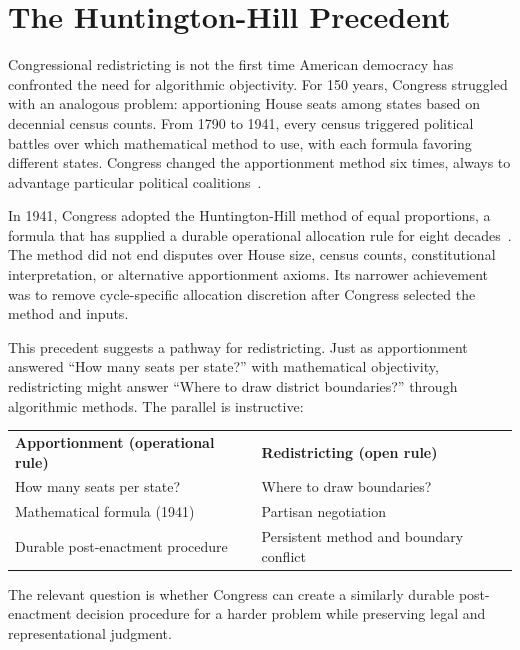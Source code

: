 \section{The Huntington-Hill Precedent}

Congressional redistricting is not the first time American democracy has confronted the need for algorithmic objectivity. For 150 years, Congress struggled with an analogous problem: apportioning House seats among states based on decennial census counts. From 1790 to 1941, every census triggered political battles over which mathematical method to use, with each formula favoring different states. Congress changed the apportionment method six times, always to advantage particular political coalitions~\cite{balinski1982fair}.

In 1941, Congress adopted the Huntington-Hill method of equal proportions, a
formula that has supplied a durable operational allocation rule for eight
decades~\cite{huntington1928methods}. The method did not end disputes over
House size, census counts, constitutional interpretation, or alternative
apportionment axioms. Its narrower achievement was to remove cycle-specific
allocation discretion after Congress selected the method and inputs.

This precedent suggests a pathway for redistricting. Just as apportionment answered ``How many seats per state?'' with mathematical objectivity, redistricting might answer ``Where to draw district boundaries?'' through algorithmic methods. The parallel is instructive:

\begin{center}
\begin{tabular}{ll}
\textbf{Apportionment (operational rule)} & \textbf{Redistricting (open rule)} \\
How many seats per state? & Where to draw boundaries? \\
Mathematical formula (1941) & Partisan negotiation \\
Durable post-enactment procedure & Persistent method and boundary conflict \\
\end{tabular}
\end{center}

The relevant question is whether Congress can create a similarly durable
post-enactment decision procedure for a harder problem while preserving legal
and representational judgment.
